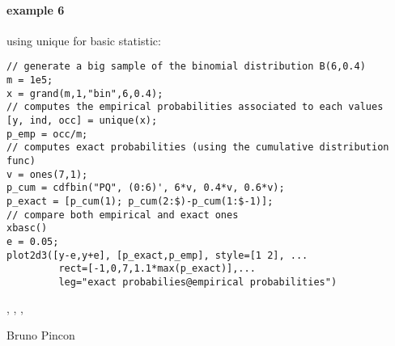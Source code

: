 \begin{examples}
\paragraph{example 6} using unique for basic statistic:
\begin{Verbatim}
// generate a big sample of the binomial distribution B(6,0.4)
m = 1e5;
x = grand(m,1,"bin",6,0.4); 
// computes the empirical probabilities associated to each values
[y, ind, occ] = unique(x);
p_emp = occ/m;
// computes exact probabilities (using the cumulative distribution func)
v = ones(7,1);
p_cum = cdfbin("PQ", (0:6)', 6*v, 0.4*v, 0.6*v);
p_exact = [p_cum(1); p_cum(2:$)-p_cum(1:$-1)];
// compare both empirical and exact ones
xbasc()
e = 0.05;
plot2d3([y-e,y+e], [p_exact,p_emp], style=[1 2], ...
         rect=[-1,0,7,1.1*max(p_exact)],...
         leg="exact probabilies@empirical probabilities")
\end{Verbatim}

\end{examples}

\begin{manseealso}
  , , ,   
\end{manseealso}

\begin{authors}
  Bruno Pincon
\end{authors}
